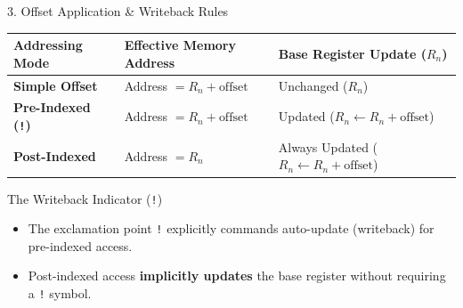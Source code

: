 \documentclass[aspectratio=169,10pt]{beamer}
\begin{document}
\begin{frame}{3. Offset Application \& Writeback Rules}
  \begin{center}
    \small
    \begin{tabular}{p{3.4cm} p{4.8cm} p{4.5cm}}
      \toprule
      \textbf{Addressing Mode} & \textbf{Effective Memory Address} & \textbf{Base Register Update ($R_n$)} \\
      \midrule
      \textbf{Simple Offset} & Address $= R_n + \text{offset}$ & Unchanged ($R_n$) \\
      \rowcolor{gray!15}
      \textbf{Pre-Indexed (\texttt{!})} & Address $= R_n + \text{offset}$ & Updated ($R_n \leftarrow R_n + \text{offset}$) \\
      \textbf{Post-Indexed} & Address $= R_n$ & Always Updated ($R_n \leftarrow R_n + \text{offset}$) \\
      \bottomrule
    \end{tabular}
  \end{center}

  \vspace{0.3cm}
  \begin{block}{The Writeback Indicator (\texttt{!})}
    \begin{itemize}
      \item The exclamation point \texttt{!} explicitly commands auto-update (writeback) for pre-indexed access.
      \item Post-indexed access \textbf{implicitly updates} the base register without requiring a \texttt{!} symbol.
    \end{itemize}
  \end{block}
\end{frame}
\end{document}
